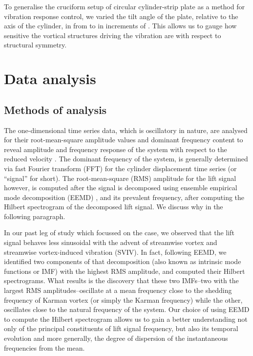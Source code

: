 \documentclass[a4paper]{article}
\begin{document}
To generalise the cruciform setup of circular cylinder-strip plate as a method for vibration response control, we varied the tilt angle of the plate, relative to the axis of the cylinder, in from \rze{} to \rfo{} in increments of \ron{}. This allows us to gauge how sensitive the vortical structures driving the vibration are with respect to structural symmetry.

\section{Data analysis} \label{analysis}

\subsection{Methods of analysis}

The one-dimensional time series data, which is oscillatory in nature, are analysed for their root-mean-square amplitude values and dominant frequency content to reveal amplitude and frequency response of the system with respect to the reduced velocity \ured{}. The dominant frequency of the system, is generally determined via fast Fourier transform (FFT) for the cylinder displacement time series (or ``signal'' for short). The root-mean-square (RMS) amplitude for the lift signal however, is computed after the signal is decomposed using ensemble empirical mode decomposition (EEMD) \parencite{Huang1998,Wu2008}, and its prevalent frequency, after computing the Hilbert spectrogram of the decomposed lift signal. We discuss why in the following paragraph.

In our past leg of study which focussed on the \rfo{} case, we observed that the lift signal behaves less sinusoidal with the advent of streamwise vortex and streamwise vortex-induced vibration (SVIV). In fact, following EEMD, we identified two components of that decomposition (also known as intrinsic mode functions or IMF) with the highest RMS amplitude, and computed their Hilbert spectrograms. What results is the discovery that these two IMFs--two with the largest RMS amplitudes--oscillate at a mean frequency close to the shedding frequency of Karman vortex (or simply the Karman frequency) while the other, oscillates close to the natural frequency of the system. Our choice of using EEMD to compute the Hilbert spectrogram allows us to gain a better understanding not only of the principal constituents of lift signal frequency, but also its temporal evolution and more generally, the degree of dispersion of the instantaneous frequencies from the mean. 
\end{document}
